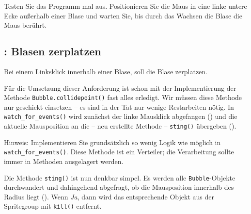 
Testen Sie das Programm mal aus. Positionieren Sie die Maus in eine linke untere Ecke außerhalb einer Blase und warten Sie, bis durch das Wachsen die Blase die Maus berührt.

\subsection{: Blasen zerplatzen}
    Bei einem Linksklick innerhalb einer Blase, soll die Blase zerplatzen.
\er

Für die Umsetzung dieser Anforderung ist schon mit der Implementierung der Methode \texttt{Bubble.collidepoint()} fast alles erledigt. Wir müssen diese Methode nur geschickt einsetzen -- es sind in der Tat nur wenige Restarbeiten nötig. In \texttt{watch\_for\_events()} wird zunächst der linke Mausklick abgefangen () und die aktuelle Mausposition an die -- neu erstellte Methode -- \texttt{sting()} übergeben (). 

Hinweis: Implementieren Sie grundsätzlich so wenig Logik wie möglich in \texttt{watch\_\-for\_\-e\-vents()}. Diese Methode ist ein Verteiler; die Verarbeitung sollte immer in Methoden ausgelagert werden.


Die Methode \texttt{sting()} ist nun denkbar simpel. Es werden alle \texttt{Bubble}-Objekte durchwandert und dahingehend abgefragt, ob die Mausposition innerhalb des Radius liegt (). Wenn \emph{Ja}, dann wird das entsprechende Objekt aus der Spritegroup mit \texttt{kill()} entfernt.



